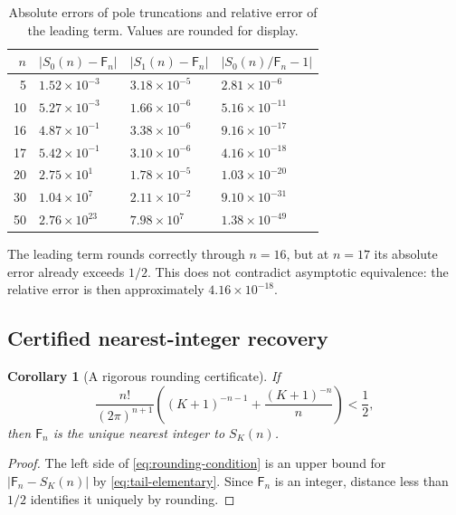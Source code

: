 \documentclass[11pt,a4paper]{article}
\newtheorem{corollary}[theorem]{Corollary}
\theoremstyle{definition}
\theoremstyle{remark}
\newcommand{\Fub}{\mathsf F}
\newcommand{\abs}[1]{\left|#1\right|}
\begin{document}
\begin{table}[ht]
\centering
\caption{Absolute errors of pole truncations and relative error of the leading
term.  Values are rounded for display.}
\label{tab:errors}
\begin{tabular}{@{}rlll@{}}
\toprule
\(n\)&\(\abs{S_0(n)-\Fub_n}\)&\(\abs{S_1(n)-\Fub_n}\)&
\(\abs{S_0(n)/\Fub_n-1}\)\\
\midrule
5  &\(1.52\times10^{-3}\)&\(3.18\times10^{-5}\)&\(2.81\times10^{-6}\)\\
10 &\(5.27\times10^{-3}\)&\(1.66\times10^{-6}\)&\(5.16\times10^{-11}\)\\
16 &\(4.87\times10^{-1}\)&\(3.38\times10^{-6}\)&\(9.16\times10^{-17}\)\\
17 &\(5.42\times10^{-1}\)&\(3.10\times10^{-6}\)&\(4.16\times10^{-18}\)\\
20 &\(2.75\times10^{1}\)&\(1.78\times10^{-5}\)&\(1.03\times10^{-20}\)\\
30 &\(1.04\times10^{7}\)&\(2.11\times10^{-2}\)&\(9.10\times10^{-31}\)\\
50 &\(2.76\times10^{23}\)&\(7.98\times10^{7}\)&\(1.38\times10^{-49}\)\\
\bottomrule
\end{tabular}
\end{table}

The leading term rounds correctly through \(n=16\), but at \(n=17\) its
absolute error already exceeds \(1/2\).  This does not contradict asymptotic
equivalence: the relative error is then approximately \(4.16\times10^{-18}\).

\subsection{Certified nearest-integer recovery}

\begin{corollary}[A rigorous rounding certificate]\label{cor:rounding}
If
\begin{equation}\label{eq:rounding-condition}
 \frac{n!}{(2\pi)^{n+1}}
 \left((K+1)^{-n-1}+\frac{(K+1)^{-n}}{n}\right)<\frac12,
\end{equation}
then \(\Fub_n\) is the unique nearest integer to \(S_K(n)\).
\end{corollary}

\begin{proof}
The left side of \eqref{eq:rounding-condition} is an upper bound for
\(\abs{\Fub_n-S_K(n)}\) by \eqref{eq:tail-elementary}.  Since \(\Fub_n\) is an
integer, distance less than \(1/2\) identifies it uniquely by rounding.
\end{proof}
\end{document}
